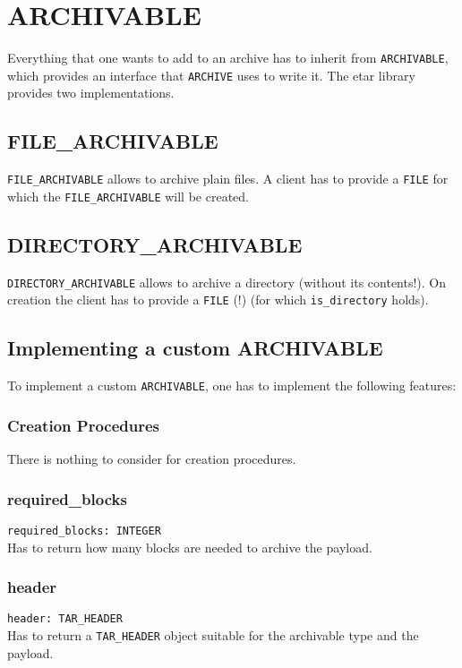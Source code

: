 \chapter{ARCHIVABLE}
Everything that one wants to add to an archive has to inherit from
\lstinline;ARCHIVABLE;, which provides an interface that \lstinline;ARCHIVE;
uses to write it. The etar library provides two implementations.

\section{FILE\_ARCHIVABLE}
\lstinline;FILE_ARCHIVABLE; allows to archive plain files. A client has to
provide a \lstinline;FILE; for which the \lstinline;FILE_ARCHIVABLE; will be
created.

\section{DIRECTORY\_ARCHIVABLE}
\lstinline;DIRECTORY_ARCHIVABLE; allows to archive a directory (without its
contents!). On creation the client has to provide a \lstinline;FILE; (!) (for
which \lstinline;is_directory; holds).

\section{Implementing a custom ARCHIVABLE}
To implement a custom \lstinline;ARCHIVABLE;, one has to implement the following
features:

\subsection{Creation Procedures}
There is nothing to consider for creation procedures.

\subsection{required\_blocks}
\lstinline;required_blocks: INTEGER; \\
Has to return how many blocks are needed to archive the payload.

\subsection{header}
\lstinline;header: TAR_HEADER; \\
Has to return a \lstinline;TAR_HEADER; object suitable for the archivable type
and the payload.

